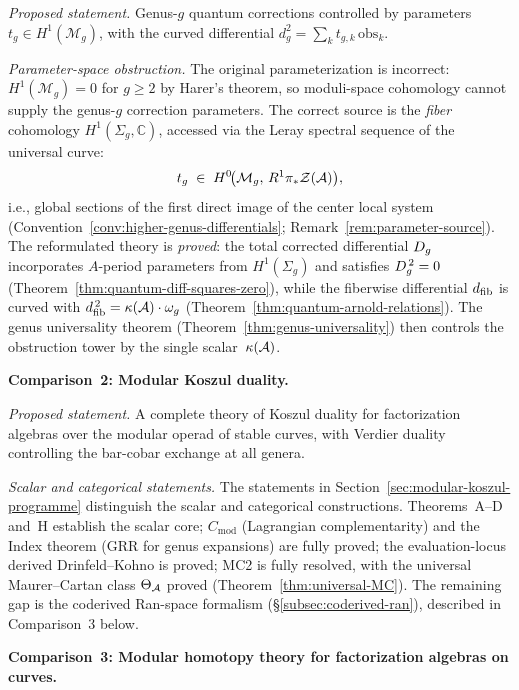 \emph{Proposed statement.}
Genus-$g$ quantum corrections controlled by parameters
$t_g \in H^1(\mathcal{M}_g)$, with the curved differential
$d_g^2 = \sum_k t_{g,k}\,\mathrm{obs}_k$.

\emph{Parameter-space obstruction.}
The original parameterization is incorrect: $H^1(\mathcal{M}_g) = 0$
for $g \geq 2$ by Harer's theorem, so moduli-space cohomology cannot
supply the genus-$g$ correction parameters.  The correct source is
the \emph{fiber} cohomology $H^1(\Sigma_g, \mathbb{C})$, accessed
via the Leray spectral sequence of the universal curve:
\[
t_g \;\in\; H^0\!\bigl(\mathcal{M}_g,\, R^1\pi_*\mathcal{Z}(\mathcal{A})\bigr),
\]
i.e., global sections of the first direct image of the center local
system (Convention~\ref{conv:higher-genus-differentials};
Remark~\ref{rem:parameter-source}).  The reformulated theory is
\emph{proved}: the total corrected differential $D_{g}$ incorporates
$A$-period parameters from $H^1(\Sigma_g)$ and satisfies
$D_{g}^{\,2} = 0$ (Theorem~\ref{thm:quantum-diff-squares-zero}),
while the fiberwise differential $d_{\mathrm{fib}}$ is curved with
$d_{\mathrm{fib}}^{\,2} = \kappa(\mathcal{A})\cdot\omega_g$
(Theorem~\ref{thm:quantum-arnold-relations}).  The genus
universality theorem (Theorem~\ref{thm:genus-universality}) then
controls the obstruction tower by the single scalar~$\kappa(\mathcal{A})$.

\medskip

\noindent\textbf{Comparison~2: Modular Koszul duality.}

\emph{Proposed statement.}
A complete theory of Koszul duality for factorization algebras
over the modular operad of stable curves, with Verdier duality
controlling the bar-cobar exchange at all genera.

\emph{Scalar and categorical statements.}
The statements in Section~\ref{sec:modular-koszul-programme}
distinguish the scalar and categorical constructions.  Theorems~A--D and~H establish the
scalar core; $C_{\mathrm{mod}}$ (Lagrangian complementarity) and the
Index theorem (GRR for genus expansions) are fully proved; the
evaluation-locus derived Drinfeld--Kohno is proved; MC2 is
fully resolved, with the universal Maurer--Cartan class
$\Theta_{\mathcal{A}}$ proved (Theorem~\ref{thm:universal-MC}).
The remaining gap is the coderived Ran-space formalism
(\S\ref{subsec:coderived-ran}), described in Comparison~3 below.

\medskip

\noindent\textbf{Comparison~3: Modular homotopy theory for factorization
algebras on curves.}

